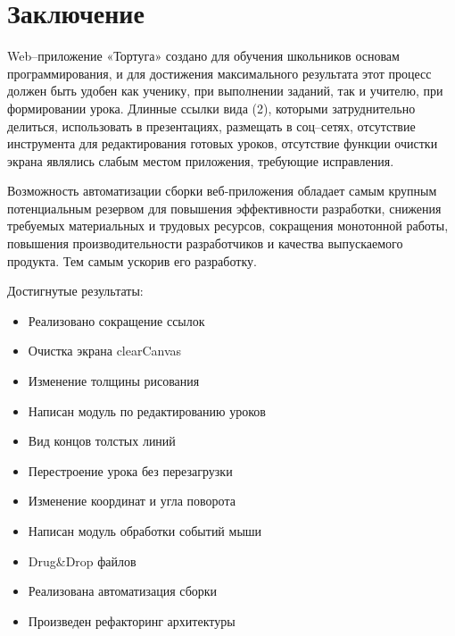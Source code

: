\chapter*{Заключение}						%

Web–приложение «Тортуга» создано для обучения школьников основам программирования, и для достижения максимального результата этот процесс должен быть удобен как ученику, при выполнении заданий, так и учителю, при формировании урока. Длинные ссылки вида (2), которыми затруднительно делиться, использовать в презентациях, размещать в соц–сетях, отсутствие инструмента для редактирования готовых уроков, отсутствие функции очистки экрана являлись слабым местом приложения, требующие исправления.\par

Возможность  автоматизации сборки веб-приложения обладает самым крупным потенциальным резервом для повышения эффективности разработки, снижения требуемых материальных и трудовых ресурсов, сокращения монотонной работы, повышения производительности разработчиков и качества выпускаемого продукта. Тем самым ускорив его разработку.\par
\vspace{16mm}
Достигнутые результаты:
\begin{itemize}
  \item Реализовано сокращение ссылок
  \item Очистка экрана clearCanvas
  \item Изменение толщины рисования
  \item Написан модуль по редактированию уроков
  \item Вид концов толстых линий
  \item Перестроение урока без перезагрузки
  \item Изменение координат и угла поворота
  \item Написан модуль обработки событий мыши
  \item Drug\&Drop файлов
  \item Реализована автоматизация сборки
  \item Произведен рефакторинг архитектуры
  
\end{itemize}


\clearpage